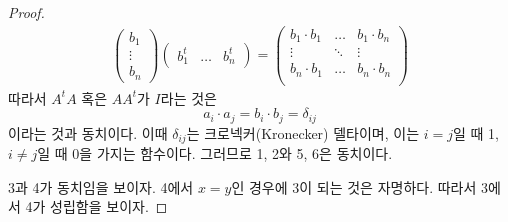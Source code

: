 \documentclass[unfonts,oneside,a4paper]{oblivoir}
\theoremstyle{definition}
\theoremstyle{theorem}
\theoremstyle{theorem}
\theoremstyle{remark}
\theoremstyle{remark}
\theoremstyle{remark}
\theoremstyle{remark}
\renewcommand{\vec}[1]{\bm{\mathit{#1}}}
\begin{document}
\begin{proof}
\begin{align*}
\begin{pmatrix}
            \vec b_1 \\ \vdots \\ \vec b_n
        \end{pmatrix}
        \begin{pmatrix}
            \vec b_1^t & \dots & \vec b_n^t
        \end{pmatrix}
        =
        \begin{pmatrix}
            \vec b_1 \cdot \vec b_1 & \dots & \vec b_1 \cdot \vec b_n\\
            \vdots & \ddots & \vdots\\
            \vec b_n \cdot \vec b_1 & \dots & \vec b_n \cdot \vec b_n\\
        \end{pmatrix}
    \end{align*}
    따라서 $A^t A$ 혹은 $AA^t$가 $I$라는 것은
    \begin{equation*}
        \vec a_i \cdot \vec a_j = \vec b_i \cdot \vec b_j = \delta_{ij}
    \end{equation*}
    이라는 것과 동치이다.
    이때 $\delta_{ij}$는 크로넥커(Kronecker) 델타이며, 이는 $i = j$일 때 1, $i \neq j$일 때 0을 가지는 함수이다.
    그러므로 1, 2와 5, 6은 동치이다.

    3과 4가 동치임을 보이자.
    4에서 $\vec x = \vec y$인 경우에 3이 되는 것은 자명하다.
    따라서 3에서 4가 성립함을 보이자.


\end{proof}
\end{document}
